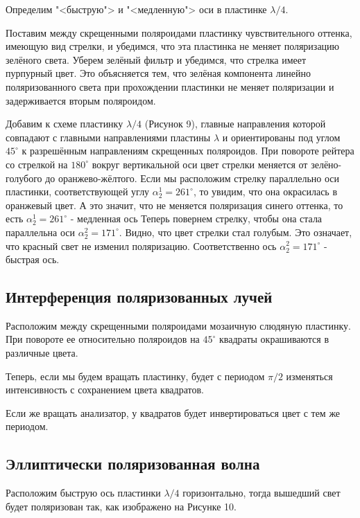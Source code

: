 \documentclass[a4paper,12pt]{article}
\begin{document}
Определим "<быструю"> и "<медленную"> оси в пластинке $ \lambda/4 $.

Поставим между скрещенными поляроидами пластинку чувствительного оттенка, имеющую вид стрелки, и убедимся, что эта пластинка не меняет поляризацию зелёного света. Уберем зелёный фильтр и убедимся, что стрелка имеет пурпурный
цвет. Это объясняется тем, что зелёная компонента линейно поляризованного света при прохождении пластинки не меняет поляризации и задерживается вторым поляроидом.



Добавим к схеме пластинку $ \lambda/4 $
(Рисунок 9), главные направления которой совпадают с главными направлениями пластины $ \lambda $ и ориентированы
под углом $ 45^\circ $ к разрешённым направлениям скрещенных поляроидов.
При повороте рейтера со стрелкой на $ 180^\circ $ вокруг вертикальной оси
цвет стрелки меняется от зелёно-голубого до оранжево-жёлтого.
Если мы расположим стрелку параллельно оси пластинки, соответствующей углу $\alpha_2^1 = 261^\circ$, то увидим, что она окрасилась в оранжевый цвет. А это значит, что не меняется поляризация синего оттенка, то есть $\alpha_2^1 = 261^\circ$ - медленная ось
Теперь повернем стрелку, чтобы она стала параллельна оси $\alpha_2^2 = 171^\circ$. Видно, что цвет стрелки стал голубым. Это означает, что красный свет не изменил поляризацию. Соответственно ось $\alpha_2^2 = 171^\circ$ - быстрая ось.
	
	\subsection{Интерференция поляризованных лучей}
	Расположим между скрещенными поляроидами мозаичную слюдяную пластинку. При повороте ее относительно поляроидов на $45^\circ$ квадраты окрашиваются в различные цвета. 
	
	Теперь, если мы будем вращать пластинку, будет с периодом $\pi/2$ изменяться интенсивность с сохранением цвета квадратов.
	
	Если же вращать анализатор, у квадратов будет инвертироваться цвет с тем же периодом.


\subsection{Эллиптически поляризованная волна}

Расположим быструю ось пластинки $\lambda/4$ горизонтально, тогда вышедший свет будет поляризован так, как изображено на Рисунке 10.
\end{document}
